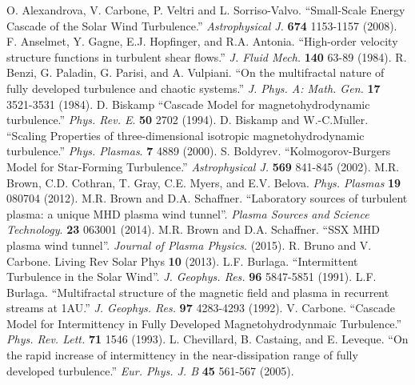 \documentclass[preprint2]{aastex}
\begin{document}
\begin{thebibliography}{}
 O. Alexandrova, V. Carbone, P. Veltri and L. Sorriso-Valvo. ``Small-Scale Energy Cascade of the Solar Wind Turbulence.'' {\it Astrophysical J.} {\bf 674} 1153-1157 (2008).
 F. Anselmet, Y. Gagne, E.J. Hopfinger, and R.A. Antonia. ``High-order velocity structure functions in turbulent shear flows.'' {\it J. Fluid Mech.} {\bf 140} 63-89 (1984).
 R. Benzi, G. Paladin, G. Parisi, and A. Vulpiani. ``On the multifractal nature of fully developed turbulence and chaotic systems.'' {\it J. Phys. A: Math. Gen.} {\bf 17} 3521-3531 (1984).
 D. Biskamp ``Cascade Model for magnetohydrodynamic turbulence.'' {\it Phys. Rev. E}. {\bf 50} 2702 (1994).
 D. Biskamp and W.-C.M$\ddot{\mathrm{u}}$ller. ``Scaling Properties of three-dimensional isotropic magnetohydrodynamic turbulence.'' {\it Phys. Plasmas}. {\bf 7} 4889 (2000).
 S. Boldyrev. ``Kolmogorov-Burgers Model for Star-Forming Turbulence.'' {\it Astrophysical J.} {\bf 569} 841-845 (2002).
 M.R. Brown, C.D. Cothran, T. Gray, C.E. Myers, and E.V. Belova. {\it Phys. Plasmas} {\bf 19} 080704 (2012).
 M.R. Brown and D.A. Schaffner. ``Laboratory sources of turbulent plasma: a unique MHD plasma wind tunnel''. {\it Plasma Sources and Science Technology}. {\bf 23} 063001 (2014).
 M.R. Brown and D.A. Schaffner. ``SSX MHD plasma wind tunnel''. {\it Journal of Plasma Physics}. (2015).
 R. Bruno and V. Carbone. Living Rev Solar Phys {\bf 10} (2013).
 L.F. Burlaga. ``Intermittent Turbulence in the Solar Wind''. {\it J. Geophys. Res.} {\bf 96} 5847-5851 (1991).
 L.F. Burlaga. ``Multifractal structure of the magnetic field and plasma in recurrent streams at 1AU.'' {\it J. Geophys. Res.} {\bf 97} 4283-4293 (1992).
 V. Carbone. ``Cascade Model for Intermittency in Fully Developed Magnetohydrodynmaic Turbulence.'' {\it Phys. Rev. Lett.} {\bf 71} 1546 (1993).
 L. Chevillard, B. Castaing, and E. Leveque. ``On the rapid increase of intermittency in the near-dissipation range of fully developed turbulence.'' {\it Eur. Phys. J. B} {\bf 45} 561-567 (2005).

\end{thebibliography}
\end{document}
